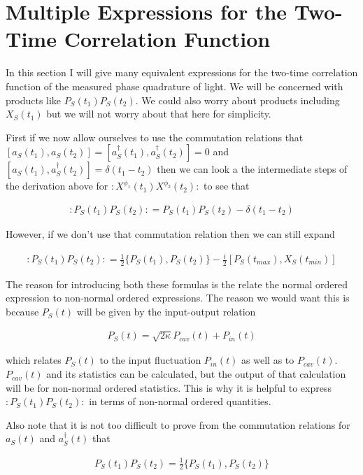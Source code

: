 \documentclass[12pt]{article}
\begin{document}
\section{Multiple Expressions for the Two-Time Correlation Function}

In this section I will give many equivalent expressions for the two-time correlation function of the measured phase quadrature of light. We will be concerned with products like $P_S(t_1)P_S(t_2)$. We could also worry about products including $X_S(t_1)$ but we will not worry about that here for simplicity. 

First if we now allow ourselves to use the commutation relations that $[a_S(t_1),a_S(t_2)] = [a_S^{\dag}(t_1),a_S^{\dag}(t_2)] = 0$ and $[a_S(t_1),a_S^{\dag}(t_2)] = \delta(t_1-t_2)$ then we can look a the intermediate steps of the derivation above for $:X^{\phi_1}(t_1)X^{\phi_2}(t_2):$  to see that

\begin{align}
:P_S(t_1)P_S(t_2): = P_S(t_1)P_S(t_2) - \delta(t_1-t_2)
\end{align}

However, if we don't use that commutation relation then we can still expand

\begin{align}
:P_S(t_1)P_S(t_2): = \frac{1}{2}\{P_S(t_1),P_S(t_2)\} - \frac{i}{2}[P_S(t_{max}),X_S(t_{min}) ]
\end{align}

The reason for introducing both these formulas is the relate the normal ordered expression to non-normal ordered expressions. The reason we would want this is because $P_S(t)$ will be given by the input-output relation

\begin{align}
P_S(t) = \sqrt{2\kappa} P_{cav}(t) + P_{in}(t)
\end{align}

which relates $P_S(t)$ to the input fluctuation $P_{in}(t)$ as well as to $P_{cav}(t)$. $P_{cav}(t)$ and its statistics can be calculated, but the output of that calculation will be for non-normal ordered statistics. This is why it is helpful to express $:P_S(t_1)P_S(t_2):$ in terms of non-normal ordered quantities.

Also note that it is not too difficult to prove from the commutation relations for $a_S(t)$ and $a_S^{\dag}(t)$ that 

\begin{align}
P_S(t_1)P_S(t_2) = \frac{1}{2}\{P_S(t_1),P_S(t_2) \}
\end{align}
\end{document}
